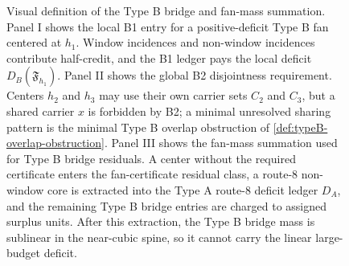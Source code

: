 \documentclass[11pt]{article}
\begin{document}
\begin{figure}[t]
{%
}
\caption[Visual definition of the Type B bridge and fan-mass summation]{Visual definition of the Type B bridge and fan-mass summation.  Panel I shows the local B1 entry for a positive-deficit Type B fan centered at \(h_1\).  Window incidences and non-window incidences contribute half-credit, and the B1 ledger pays the local deficit \(D_B(\mathfrak F_{h_1})\).  Panel II shows the global B2 disjointness requirement.  Centers \(h_2\) and \(h_3\) may use their own carrier sets \(C_2\) and \(C_3\), but a shared carrier \(x\) is forbidden by B2; a minimal unresolved sharing pattern is the minimal Type B overlap obstruction of \cref{def:typeB-overlap-obstruction}.  Panel III shows the fan-mass summation used for Type B bridge residuals.  A center without the required certificate enters the fan-certificate residual class, a route-8 non-window core is extracted into the Type A route-8 deficit ledger \(D_A\), and the remaining Type B bridge entries are charged to assigned surplus units.  After this extraction, the Type B bridge mass is sublinear in the near-cubic spine, so it cannot carry the linear large-budget deficit.}
\label{fig:typeB-bridge-fanmass-gadget}
\end{figure}
\end{document}
